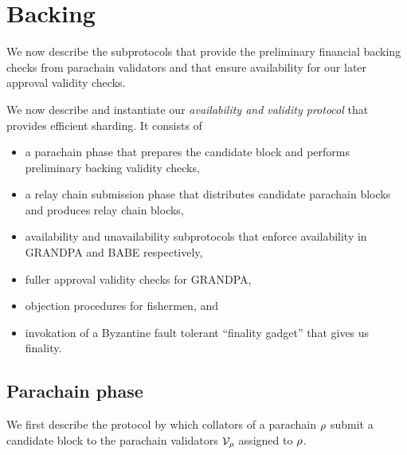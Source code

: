 
\section{Backing}
\label{sec:backing}

We now describe the subprotocols that provide the preliminary financial backing checks from parachain validators and that ensure availability for our later approval validity checks.


We now describe and instantiate our {\em availability and validity protocol} that provides efficient sharding.  It consists of 
\begin{itemize}
\item a parachain phase that prepares the candidate block and performs preliminary backing validity checks,
\item a relay chain submission phase that distributes candidate parachain blocks and produces relay chain blocks,
\item availability and unavailability subprotocols that enforce availability in GRANDPA and BABE respectively,
\item fuller approval validity checks for GRANDPA,
\item objection procedures for fishermen, and
\item invokation of a Byzantine fault tolerant ``finality gadget'' that gives us finality.
\end{itemize}




\subsection{Parachain phase} 
\label{sec:parachain}

We first describe the protocol by which collators of a parachain $\rho$ submit a candidate block to the parachain validators $\mathcal{V}_{\rho}$ assigned to $\rho$.

\smallskip
